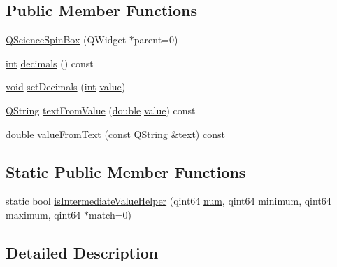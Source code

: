 \subsection*{Public Member Functions}
\begin{DoxyCompactItemize}
\item 
\hyperlink{class_q_science_spin_box_a6cd4f6f08b9b7895a3709a56452c0957}{Q\-Science\-Spin\-Box} (Q\-Widget $\ast$parent=0)
\item 
\hyperlink{ioapi_8h_a787fa3cf048117ba7123753c1e74fcd6}{int} \hyperlink{class_q_science_spin_box_adc80b959811031cd29f004619dae688c}{decimals} () const 
\item 
\hyperlink{group___u_a_v_objects_plugin_ga444cf2ff3f0ecbe028adce838d373f5c}{void} \hyperlink{class_q_science_spin_box_a80c0164fac20ef5fbe49016f2d8c2c9e}{set\-Decimals} (\hyperlink{ioapi_8h_a787fa3cf048117ba7123753c1e74fcd6}{int} \hyperlink{glext_8h_aa0e2e9cea7f208d28acda0480144beb0}{value})
\item 
\hyperlink{group___u_a_v_objects_plugin_gab9d252f49c333c94a72f97ce3105a32d}{Q\-String} \hyperlink{class_q_science_spin_box_ad3da68c402b58ea4854235b81b7b61fe}{text\-From\-Value} (\hyperlink{_super_l_u_support_8h_a8956b2b9f49bf918deed98379d159ca7}{double} \hyperlink{glext_8h_aa0e2e9cea7f208d28acda0480144beb0}{value}) const 
\item 
\hyperlink{_super_l_u_support_8h_a8956b2b9f49bf918deed98379d159ca7}{double} \hyperlink{class_q_science_spin_box_a121a55bc0e9b5f2e3169f21db7eff75a}{value\-From\-Text} (const \hyperlink{group___u_a_v_objects_plugin_gab9d252f49c333c94a72f97ce3105a32d}{Q\-String} \&text) const 
\end{DoxyCompactItemize}
\subsection*{Static Public Member Functions}
\begin{DoxyCompactItemize}
\item 
static bool \hyperlink{class_q_science_spin_box_a05f1dbc84479d35aada4ae3c985f77ef}{is\-Intermediate\-Value\-Helper} (qint64 \hyperlink{glext_8h_abb50fc1ead3a02a46fb52daa2045f95c}{num}, qint64 minimum, qint64 maximum, qint64 $\ast$match=0)
\end{DoxyCompactItemize}


\subsection{Detailed Description}


